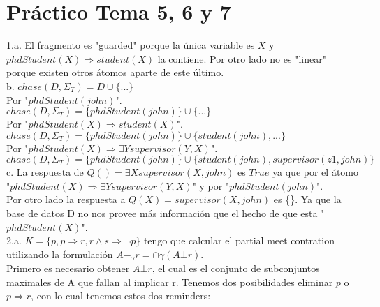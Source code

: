 \chapter{Práctico Tema 5, 6 y 7}

1.a. El fragmento es "guarded" porque la única variable es $X$ y $phdStudent(X) \Longrightarrow student(X)$ la contiene. Por otro lado no es "linear" porque existen otros átomos aparte de este último. \\

b. $chase(D, \Sigma_{T}) = D \cup \{...\}$ \\

Por "$phdStudent(john)$".\\

$chase(D, \Sigma_{T}) = \{phdStudent(john)\} \cup \{ ... \}$ \\

Por "$phdStudent(X) \Longrightarrow student(X)$". \\

$chase(D, \Sigma_{T}) = \{phdStudent(john)\} \cup \{student(john), ...\}$\\

Por "$phdStudent(X) \Longrightarrow \exists Y supervisor(Y, X)$". \\

$chase(D, \Sigma_{T}) = \{phdStudent(john)\} \cup \{student(john), supervisor(z1, john) \}$ \\

c. La respuesta de $Q() = \exists X supervisor(X, john)$ es $True$ ya que por el átomo "$phdStudent(X) \Longrightarrow \exists Y supervisor(Y, X)$" y por "$phdStudent(john)$". \\

Por otro lado la respuesta a $Q(X) = supervisor(X, john)$ es \{\}. Ya que la base de datos D no nos provee más información que el hecho de que 
esta "$phdStudent(X)$". \\

2.a. $K = \{p, p \Longrightarrow  r , r \land s  \Longrightarrow \neg p \}$ tengo que calcular el partial meet contration utilizando la formulación $A-_{\gamma}r = \cap\gamma(A \bot r)$. \\

Primero es necesario obtener $A \bot r$, el cual es el conjunto de subconjuntos maximales de A que fallan al implicar r. Tenemos dos posibilidades eliminar $p$ o $p \Longrightarrow  r$, con lo cual tenemos estos dos reminders: \\

